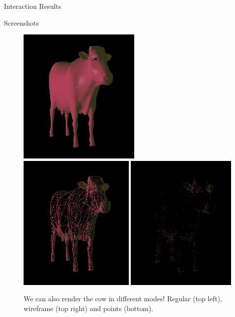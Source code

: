 \documentclass{article}
\begin{document}
\begin{section}{Interaction Results}
\begin{multicols}{2}
\begin{subsection}{Screenshots}
    \begin{figure}[H]
     \centering
     \includegraphics[width=0.7\linewidth, height=18em]{./res/normalmode.png}
     \includegraphics[width=0.7\linewidth, height=18em]{./res/wireframe.png}
     \includegraphics[width=0.7\linewidth, height=18em]{./res/pointmode.png}
     \caption{We can also render the cow in different modes! Regular (top
left), wireframe (top right) and points (bottom).}
    \end{figure}


\end{subsection}
\end{multicols}
\end{section}
\end{document}
